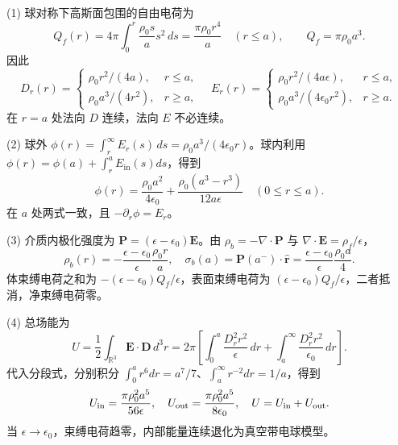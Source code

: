 (1) 球对称下高斯面包围的自由电荷为
\[
Q_f(r)=4\pi\int_0^r\frac{\rho_0s}{a}s^2\,ds=\frac{\pi\rho_0 r^4}{a}\quad(r\le a),
\qquad Q_f=\pi\rho_0a^3.
\]
因此
\[
D_r(r)=
\begin{cases}\rho_0r^2/(4a),&r\le a,\\\rho_0a^3/(4r^2),&r\ge a,\end{cases}\quad
E_r(r)=
\begin{cases}\rho_0r^2/(4a\epsilon),&r\le a,\\\rho_0a^3/(4\epsilon_0r^2),&r\ge a.\end{cases}
\]
在 \(r=a\) 处法向 \(D\) 连续，法向 \(E\) 不必连续。

(2) 球外 \(\phi(r)=\int_r^\infty E_r(s)\,ds=\rho_0a^3/(4\epsilon_0r)\)。球内利用 \(\phi(r)=\phi(a)+\int_r^a E_{\mathrm{in}}(s)ds\)，得到
\[
\phi(r)=\frac{\rho_0a^2}{4\epsilon_0}+\frac{\rho_0(a^3-r^3)}{12a\epsilon}\quad(0\le r\le a).
\]
在 \(a\) 处两式一致，且 \(-\partial_r\phi=E_r\)。

(3) 介质内极化强度为 \(\boldsymbol P=(\epsilon-\epsilon_0)\boldsymbol E\)。由 \(\rho_b=-\nabla\cdot\boldsymbol P\) 与 \(\nabla\cdot\boldsymbol E=\rho_f/\epsilon\)，
\[
\rho_b(r)=-\frac{\epsilon-\epsilon_0}{\epsilon}\frac{\rho_0r}{a},\quad
\sigma_b(a)=\boldsymbol P(a^-)\cdot\hat{\boldsymbol r}
=\frac{\epsilon-\epsilon_0}{\epsilon}\frac{\rho_0a}{4}.
\]
体束缚电荷之和为 \(-(\epsilon-\epsilon_0)Q_f/\epsilon\)，表面束缚电荷为 \((\epsilon-\epsilon_0)Q_f/\epsilon\)，二者抵消，净束缚电荷零。

(4) 总场能为
\[
U=\frac12\int_{\mathbb R^3}\boldsymbol E\cdot\boldsymbol D\,d^3r
=2\pi\left[\int_0^a\frac{D_r^2r^2}{\epsilon}\,dr+
\int_a^\infty\frac{D_r^2r^2}{\epsilon_0}\,dr\right].
\]
代入分段式，分别积分 \(\int_0^ar^6dr=a^7/7\)、\(\int_a^\infty r^{-2}dr=1/a\)，得到
\[
U_{\rm in}=\frac{\pi\rho_0^2a^5}{56\epsilon},\quad
U_{\rm out}=\frac{\pi\rho_0^2a^5}{8\epsilon_0},\quad U=U_{\rm in}+U_{\rm out}.
\]
当 \(\epsilon\to\epsilon_0\)，束缚电荷趋零，内部能量连续退化为真空带电球模型。
